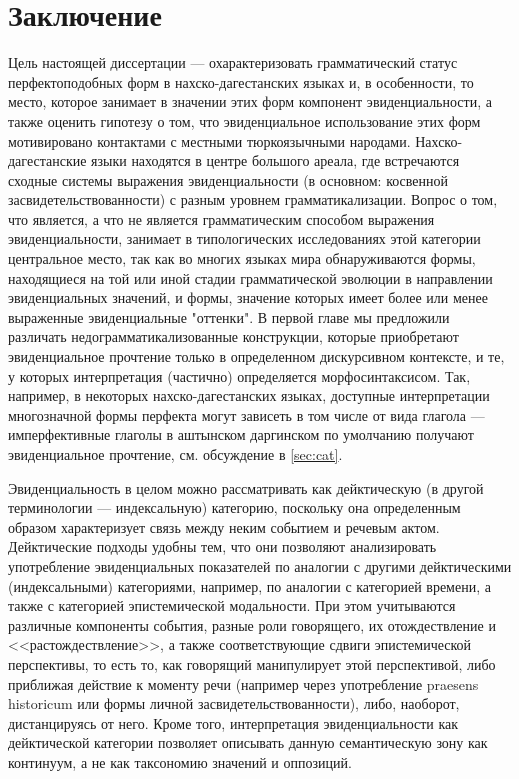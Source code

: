
\chapter*{Заключение}

Цель настоящей диссертации --- охарактеризовать грамматический статус перфектоподобных форм в нахско-дагестанских языках и, в особенности, то место, которое занимает в значении этих форм компонент эвиденциальности, а также оценить гипотезу о том, что эвиденциальное использование этих форм мотивировано контактами с местными тюркоязычными народами. Нахско-дагестанские языки находятся в центре большого ареала, где встречаются сходные системы выражения эвиденциальности (в основном: косвенной засвидетельствованности) с разным уровнем грамматикализации. Вопрос о том, что является, а что не является грамматическим способом выражения эвиденциальности, занимает в типологических исследованиях этой категории центральное место, так как во многих языках мира обнаруживаются формы, находящиеся на той или иной стадии грамматической эволюции в направлении эвиденциальных значений, и формы, значение которых имеет более или менее выраженные эвиденциальные "оттенки". В первой главе мы предложили различать недограмматикализованные конструкции, которые приобретают эвиденциальное прочтение только в определенном дискурсивном контексте, и те, у которых интерпретация (частично) определяется морфосинтаксисом. Так, например, в  некоторых нахско-дагестанских языках, доступные интерпретации многозначной формы перфекта могут зависеть в том числе от вида глагола --- имперфективные глаголы в аштынском даргинском по умолчанию получают эвиденциальное прочтение, см. обсуждение в \ref{sec:cat}.
\par Эвиденциальность в целом можно рассматривать как дейктическую (в другой терминологии --- индексальную) категорию, поскольку она определенным образом характеризует связь между неким событием и речевым актом. Дейктические подходы удобны тем, что они позволяют анализировать употребление эвиденциальных показателей по аналогии с другими дейктическими (индексальными) категориями, например, по аналогии с категорией времени, а также с категорией эпистемической модальности. При этом учитываются различные компоненты события, разные роли говорящего, их отождествление и <<растождествление>>, а также соответствующие сдвиги эпистемической перспективы, то есть то, как говорящий манипулирует этой перспективой, либо приближая действие к моменту речи (например через употребление praesens historicum или формы личной засвидетельствованности), либо, наоборот, дистанцируясь от него. Кроме того, интерпретация эвиденциальности как дейктической категории позволяет описывать данную семантическую зону как континуум, а не как таксономию значений и оппозиций. 
